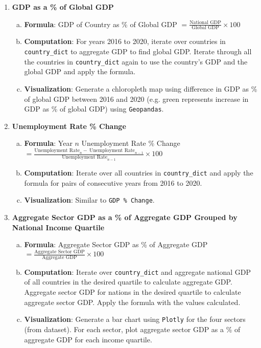 \documentclass[fontsize=11pt]{article}
\begin{document}
\begin{enumerate}
        \item \textbf{GDP as a \% of Global GDP}
            \begin{enumerate}[(a)]
                \item \textbf{Formula}: GDP of Country as \% of Global GDP $= \frac{\text{National GDP}}{\text{Global GDP}} \times 100$
                \item \textbf{Computation}: For years 2016 to 2020, iterate over countries in \texttt{country\_dict} to aggregate GDP to find global GDP. Iterate through all the countries in \texttt{country\_dict} again to use the country's GDP and the global GDP and apply the formula.
                \item \textbf{Visualization}:
                Generate a chloropleth map using difference in GDP as \% of global GDP between 2016 and 2020 (e.g. green represents increase in GDP as \% of global GDP) using \texttt{Geopandas}.
            \end{enumerate}
        \item \textbf{Unemployment Rate \% Change}
            \begin{enumerate}[(a)]
                \item \textbf{Formula}: Year $n$ Unemployment Rate \% Change $= \frac{\text{Unemployment \ Rate}_{n}-\  \text{Unemployment \ Rate}_{n-1}}{\text{Unemployment \ Rate}_{n-1}} \times 100$
                \item \textbf{Computation}: Iterate over all countries in \texttt{country\_dict} and apply the formula for pairs of consecutive years from 2016 to 2020.
                \item \textbf{Visualization}: Similar to \texttt{GDP \% Change}.
            \end{enumerate}
        \item \textbf{Aggregate Sector GDP as a \% of Aggregate GDP Grouped by National Income Quartile}
            \begin{enumerate}[(a)]
                \item \textbf{Formula}: Aggregate Sector GDP as \% of Aggregate GDP $= \frac{\text{Aggregate \ Sector \ GDP}}{\text{Aggregate \ GDP}} \times 100$
                \item \textbf{Computation}: Iterate over \texttt{country\_dict} and aggregate national GDP of all countries in the desired quartile to calculate aggregate GDP. Aggregate sector GDP for nations in the desired quartile to calculate aggregate sector GDP. Apply the formula with the values calculated.
                \item \textbf{Visualization}: Generate a bar chart using \texttt{Plotly} for the four sectors (from dataset). For each sector, plot aggregate sector GDP as a \% of aggregate GDP for each income quartile.
            \end{enumerate}


\end{enumerate}
\end{document}
